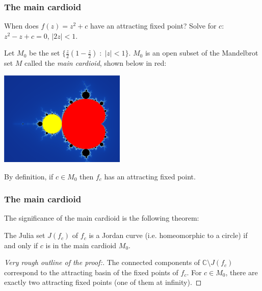 \documentclass{beamer} %
\theoremstyle{definition} %
\newcommand{\Cplx}{\mathbb{C}}
\begin{document}
\begin{frame}\frametitle{The main cardioid}
    When does $f(z) = z^2+c$ have an attracting fixed point? Solve for $c$:
    $z^2-z+c = 0$, $|2z| < 1$.
    
    Let $M_0$ be the set $\{\frac{z}{2}(1-\frac{z}{2})\;:\;|z|<1\}$. $M_0$ is 
    an open subset of the Mandelbrot set $M$ called the \emph{main cardioid}, shown below in red:
    \begin{center}
        \includegraphics[width=60mm]{img/main-cardioid.png}
    \end{center}
    By definition, if $c \in M_0$ then $f_c$ has an attracting fixed point.
\end{frame}

\begin{frame}\frametitle{The main cardioid}
    The significance of the main cardioid is the following theorem:
    \begin{theorem}
        The Julia set $J(f_c)$ of $f_c$ is a Jordan curve (i.e. homeomorphic to a circle) if and only if $c$ is in the main cardioid $M_0$.
    \end{theorem}
    \begin{proof}[Very rough outline of the proof:]
        The connected components of $\Cplx\setminus J(f_c)$ correspond to the attracting basin of the fixed points of $f_c$. For $c \in M_0$,
        there are exactly two attracting fixed points (one of them at infinity). 
    \end{proof}
\end{frame}

\end{document}

